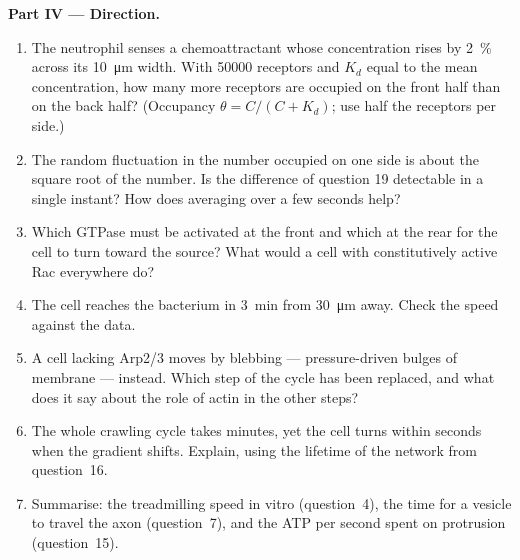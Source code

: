 \begin{problem}
\medskip
\noindent\textbf{Part IV --- Direction.}
\begin{enumerate}[resume]
  \item The neutrophil senses a chemoattractant whose concentration
        rises by \qty{2}{\%} across its \qty{10}{\micro m} width. With
        \num{50000} receptors and $K_{d}$ equal to the mean
        concentration, how many more receptors are occupied on the
        front half than on the back half? (Occupancy $\theta = C/(C +
        K_{d})$; use half the receptors per side.)
  \item The random fluctuation in the number occupied on one side is
        about the square root of the number. Is the difference of
        question 19 detectable in a single instant? How does averaging
        over a few seconds help?
  \item Which GTPase must be activated at the front and which at the
        rear for the cell to turn toward the source? What would a cell
        with constitutively active Rac everywhere do?
  \item The cell reaches the bacterium in \qty{3}{min} from
        \qty{30}{\micro m} away. Check the speed against the data.
  \item A cell lacking Arp2/3 moves by blebbing --- pressure-driven
        bulges of membrane --- instead. Which step of the cycle has
        been replaced, and what does it say about the role of actin in
        the other steps?
  \item The whole crawling cycle takes minutes, yet the cell turns
        within seconds when the gradient shifts. Explain, using the
        lifetime of the network from question~16.
  \item Summarise: the treadmilling speed in vitro (question~4), the
        time for a vesicle to travel the axon (question~7), and the ATP
        per second spent on protrusion (question~15).
\end{enumerate}
\end{problem}
